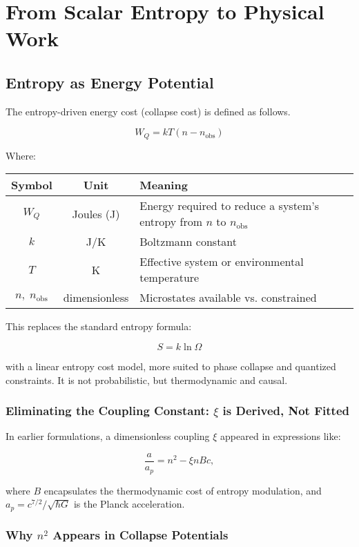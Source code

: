 \documentclass[12pt]{article}
\begin{document}
\section{From Scalar Entropy to Physical Work}

\subsection{Entropy as Energy Potential}

The entropy-driven energy cost (collapse cost) is defined as follows.

\[
W_Q = kT(n - n_{\text{obs}})
\]

\noindent
Where:

\begin{center}
\begin{tabular}{|c|c|p{10cm}|}
\hline
\textbf{Symbol} & \textbf{Unit} & \textbf{Meaning} \\
\hline
$W_Q$ & Joules (J) & Energy required to reduce a system’s entropy from $n$ to $n_{\text{obs}}$ \\
\hline
$k$ & J/K & Boltzmann constant \\
\hline
$T$ & K & Effective system or environmental temperature \\
\hline
$n,\; n_{\text{obs}}$ & dimensionless & Microstates available vs. constrained \\
\hline
\end{tabular}
\end{center}

This replaces the standard entropy formula:

\[
S = k \ln \Omega
\]

\noindent
with a linear entropy cost model, more suited to phase collapse and quantized constraints. It is not probabilistic, but thermodynamic and causal.

\subsubsection*{Eliminating the Coupling Constant: $\xi$ is Derived, Not Fitted}

In earlier formulations, a dimensionless coupling $\xi$ appeared in expressions like:

\[
\frac{a}{a_p} = n^2 - \xi n B c,
\]

where $B$ encapsulates the thermodynamic cost of entropy modulation, and $a_p = c^{7/2} / \sqrt{\hbar G}$ is the Planck acceleration.

\subsubsection*{Why $n^2$ Appears in Collapse Potentials}
\end{document}
